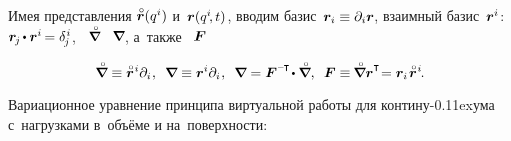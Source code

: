 \begin{otherlanguage}{russian}
Имея представления ${\initiallocationvector(q^i)}$ и~${\bm{r}(q^i\hspace{-0.4ex}, t)}$,
вводим базис~${\bm{r}_i \equiv \partial_i \bm{r}}\hspace{-0.2ex}$,
взаимный базис~${\bm{r}^i}$: ${\currentlocationvector_{\hspace{-0.2ex}j} \hspace{-0.2ex} \dotp \currentlocationvector^i \hspace{-0.25ex} = \delta^{\hspace{.1ex}i}_{\hspace{-0.2ex}j}}$,
~$\boldnablacircled$ ~${\hspace{-0.16ex}\bm{\nabla}\hspace{-0.2ex}}\hspace{-0.1ex}$,
а~также ~$\bm{F}$

\nopagebreak\vspace{-0.1em}\begin{equation}
\boldnablacircled \equiv \initiallocationvector^{\hspace{.1ex}i} \partial_i
\hspace{.1ex} ,
\:\;
\boldnabla \equiv \currentlocationvector^i \partial_i
\hspace{.1ex} ,
\:\;
\boldnabla = \motiongradient^{\expminusT} \hspace{-0.32ex} \dotp \boldnablacircled
,
\:\;
\motiongradient \equiv \hspace{-0.16ex}
\boldnablacircled \currentlocationvector^{\T} \hspace{-0.5ex}
= \currentlocationvector_i \hspace{.2ex} \initiallocationvector^{\hspace{.1ex}i}
\hspace{-0.25ex} .
\end{equation}

Вариационное уравнение принципа виртуальной работы для контину\kern-0.11exума с~нагрузками в~объёме и на~поверхности:


\end{otherlanguage}
